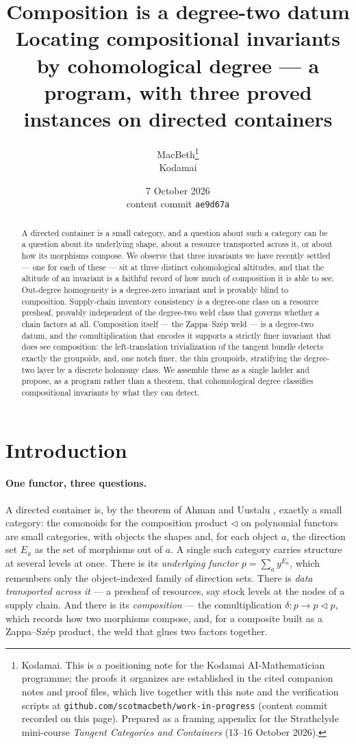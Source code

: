 \documentclass[11pt]{article}
\title{Composition is a degree-two datum\\
\large Locating compositional invariants by cohomological degree ---
a program, with three proved instances on directed containers}
\author{MacBeth\thanks{Kodamai. This is a positioning note for the Kodamai
AI-Mathematician programme; the proofs it organizes are established in the cited companion notes
and proof files, which live together with this note and the verification scripts at
\texttt{github.com/scotmacbeth/work-in-progress} (content commit recorded on this page). Prepared
as a framing appendix for the Strathclyde mini-course \emph{Tangent Categories and Containers}
(13--16 October 2026).}\\
\small Kodamai}
\date{7 October 2026\\[2pt]
\small content commit \texttt{ae9d67a}}
\theoremstyle{definition}
\newcommand{\lto}{\!\lhd\!}
\begin{document}
\maketitle

\begin{abstract}
A directed container is a small category, and a question about such a category can be a question
about its underlying shape, about a resource transported across it, or about how its morphisms
compose. We observe that three invariants we have recently settled --- one for each of these ---
sit at three distinct cohomological altitudes, and that the altitude of an invariant is a faithful
record of how much of composition it is able to see. Out-degree homogeneity is a degree-zero
invariant and is provably blind to composition. Supply-chain inventory consistency is a degree-one
class on a resource presheaf, provably independent of the degree-two weld class that governs
whether a chain factors at all. Composition itself --- the Zappa--Sz\'ep weld --- is a degree-two
datum, and the comultiplication that encodes it supports a strictly finer invariant that does see
composition: the left-translation trivialization of the tangent bundle detects exactly the
groupoids, and, one notch finer, the thin groupoids, stratifying the degree-two layer by a
discrete holonomy class. We assemble these as a single ladder and propose, as a program rather than
a theorem, that cohomological degree classifies compositional invariants by what they can detect.
\end{abstract}

\section{Introduction}\label{sec:intro}

\paragraph{One functor, three questions.}
A directed container is, by the theorem of Ahman and Uustalu \cite{AhmanUustalu2016}, exactly a
small category: the comonoids for the composition product $\lhd$ on polynomial functors are small
categories, with objects the shapes and, for each object $a$, the direction set $E_a$ as the set of
morphisms out of $a$. A single such category carries structure at several levels at once. There is
its \emph{underlying functor} $p=\sum_a y^{E_a}$, which remembers only the object-indexed family of
direction sets. There is \emph{data transported across it} --- a presheaf of resources, say stock
levels at the nodes of a supply chain. And there is its \emph{composition} --- the comultiplication
$\delta\colon p\to p\lto p$, which records how two morphisms compose, and, for a composite built as
a Zappa--Sz\'ep product, the weld that glues two factors together.
\end{document}
